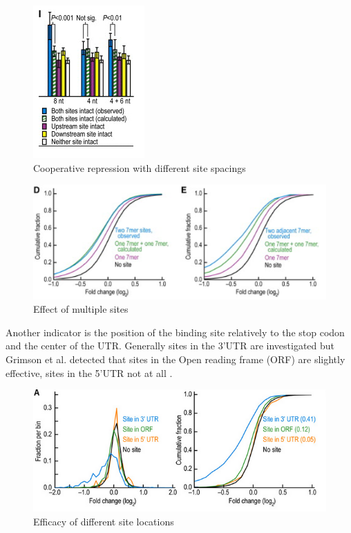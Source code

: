 \documentclass[12pt]{article}
\begin{document}
\begin{figure}
\centering
\includegraphics[scale=1.2]{results/sites_8nt.PNG}  
\caption{Cooperative repression with different site spacings}
\label{sitespacing}
\end{figure}

\begin{figure}
\centering
\includegraphics[scale=0.7]{results/sites_distance.PNG}
\caption{Effect of multiple sites}
\label{sitedistance}
\end{figure}

Another indicator is the position of the binding site relatively to the stop codon and the center of the UTR. Generally sites in the 3'UTR are investigated but Grimson et al. detected that sites in the Open reading frame (ORF) are slightly effective, sites in the 5'UTR not at all \cite{Grimson}. 

\begin{figure}
\centering
\includegraphics[scale=0.7]{results/sites_orf.PNG}
\caption{Efficacy of different site locations}
\label{siteorf}
\end{figure}
\end{document}
